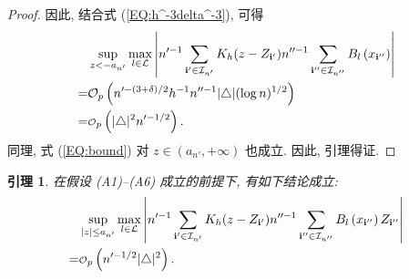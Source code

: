 \documentclass[a4paper,openay,14pt]{ctexbook}
\newtheorem{lem}{引理}
\numberwithin{equation}{section}
\numberwithin{lem}{section}
\begin{document}
\begin{proof}
        因此, 结合式 (\ref{EQ:h^-3delta^-3}), 可得
       \begin{align}
           &\sup_{ z < -a_{n'}}\max_{l\in\mathcal{L}}\left\vert n'^{-1}\sum_{\mathbf{i}'\in\mathcal{I}_{n'}}K_h(z-Z_{\mathbf{i}'})n''^{-1}\sum_{\mathbf{i}''\in\mathcal{I}_{n''}}B_{l}\left(x_{\mathbf{i}''}\right)\right\vert\notag\\
           =&\mathcal{O}_p\left(n'^{-(3+\delta)/2}h^{-1}n''^{-1}\vert\triangle\vert(\log n)^{1/2}\right)\notag\\
           =&{\scriptstyle{\mathcal{O}}}_p\left(\vert\triangle\vert^2n'^{-1/2}\right).\label{EQ:bound}
       \end{align}
       同理, 式 (\ref{EQ:bound}) 对 $z\in\left(a_{n'},+\infty\right)$ 也成立. 因此, 引理得证.
    \end{proof}

\begin{lem}\label{Lemma:KB}
    在假设 (A1)--(A6) 成立的前提下, 有如下结论成立:
    \begin{align}
        &\sup_{\vert z\vert\leq a_{n'}}\max_{l\in\mathcal{L}}\left\vert n'^{-1}\sum_{\mathbf{i}'\in\mathcal{I}_{n'}}K_h(z-Z_{\mathbf{i}'})n''^{-1}\sum_{\mathbf{i}''\in\mathcal{I}_{n''}}B_{l}\left(x_{\mathbf{i}''}\right)Z_{\mathbf{i}''}\right\vert \notag\\
        = &{\scriptstyle{\mathcal{O}}}_p\left(n'^{-1/2}\vert\triangle\vert^2\right).\notag
    \end{align}
\end{lem}
\end{document}
